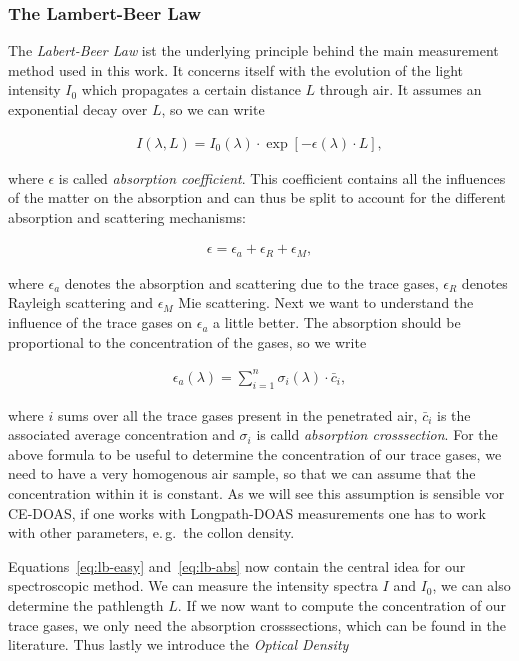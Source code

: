 \subsubsection{The Lambert-Beer Law}
\label{sec:lambert-beer}

The \emph{Labert-Beer Law} ist the underlying principle behind the
main measurement method used in this work. It concerns itself with the
evolution of the light intensity $I_0$ which propagates a certain
distance $L$ through air. It assumes an exponential decay over $L$, so
we can write

\begin{align}
  I(\lambda, L) = I_0(\lambda) \cdot \exp[-\epsilon(\lambda) \cdot
  L], \label{eq:lb-easy}
\end{align}

where $\epsilon$ is called \emph{absorption coefficient}. This
coefficient contains all the influences of the matter on the
absorption and can thus be split to account for the different
absorption and scattering mechanisms:

\begin{align*}
  \epsilon = \epsilon_a + \epsilon_R + \epsilon_M,
\end{align*}

where $\epsilon_a$ denotes the absorption and scattering due to the
trace gases, $\epsilon_R$ denotes Rayleigh scattering and $\epsilon_M$
Mie scattering. Next we want to understand the influence of the trace
gases on $\epsilon_a$ a little better. The absorption should be
proportional to the concentration of the gases, so we write

\begin{align}
  \epsilon_a(\lambda) = \sum_{i=1}^n \sigma_i(\lambda) \cdot \bar c_i, \label{eq:lb-abs}
\end{align}

where $i$ sums over all the trace gases present in the penetrated
air, $\bar c_i$ is the associated average concentration and $\sigma_i$
is calld \emph{absorption crosssection}. For the above formula to be
useful to determine the concentration of our trace gases, we need to
have a very homogenous air sample, so that we can assume that the
concentration within it is constant. As we will see this assumption is
sensible vor CE-DOAS, if one works with Longpath-DOAS measurements one
has to work with other parameters, e.\,g.\ the collon density.

Equations~\eqref{eq:lb-easy} and~\eqref{eq:lb-abs} now contain the central idea for our
spectroscopic method. We can measure the intensity spectra $I$ and
$I_0$, we can also determine the pathlength $L$. If we now want to
compute the concentration of our trace gases, we only need the
absorption crosssections, which can be found in the
literature. Thus lastly we introduce the \emph{Optical
  Density} 

